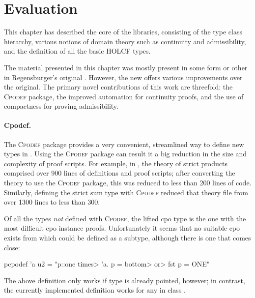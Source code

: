 
\section{Evaluation}
\label{sec:holcf-evaluation}

This chapter has described the core of the  libraries, consisting of the type class hierarchy, various notions of domain theory such as continuity and admissibility, and the definition of all the basic HOLCF types.

The material presented in this chapter was mostly present in some form or other in Regensburger's original  \cite{regensburger94thesis, regensburger95holcf}. However, the new  offers various improvements over the original. The primary novel contributions of this work are threefold: the \textsc{Cpodef} package, the improved automation for continuity proofs, and the use of compactness for proving admissibility.

\paragraph{Cpodef.} The \textsc{Cpodef} package provides a very convenient, streamlined way to define new types in . Using the \textsc{Cpodef} package can result it a big reduction in the size and complexity of proof scripts. For example, in , the theory of strict products comprised over 900 lines of definitions and proof scripts; after converting the theory to use the \textsc{Cpodef} package, this was reduced to less than 200 lines of code. Similarly, defining the strict sum type with \textsc{Cpodef} reduced that theory file from over 1300 lines to less than 300.

Of all the  types \emph{not} defined with \textsc{Cpodef}, the lifted cpo type  is the one with the most difficult cpo instance proofs. Unfortunately it seems that no suitable cpo exists from which  could be defined as a subtype, although there is one that comes close:

\begin{isacode}
pcpodef 'a u2 = "{p::one \<times> 'a. p = \<bottom> \<or> fst p = ONE}"
\end{isacode}

\noindent
The above definition only works if type  is already pointed, however; in contrast, the currently implemented definition works for any  in class .

